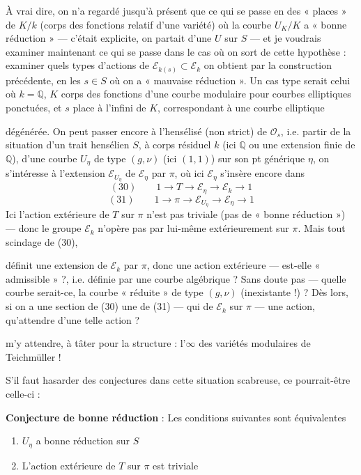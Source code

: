 \documentclass[11pt,a4paper]{article}
\begin{document}
À vrai dire, on n'a regardé jusqu'à présent que ce qui se passe en des
« places » de $K/k$ (corps des fonctions relatif d'une variété) où la
 courbe $U_K/K$ a « bonne réduction » — c'était explicite, on
partait d'une $U$ sur $S$ — et je voudrais examiner maintenant ce qui se passe
dans le cas où on sort de cette hypothèse : examiner quels types d'actions de
$\mathcal{E}_{k(s)} \subset \mathcal{E}_k$ on obtient par la construction
précédente, en les $s \in S$ où on a « mauvaise réduction ». Un cas type serait
celui où $k = \mathbb{Q}$, $K$ corps des fonctions d'une courbe modulaire pour
courbes elliptiques  ponctuées, et $s$ place
à l'infini de $K$, correspondant à une courbe elliptique

dégénérée. On peut passer encore à l'hensélisé (non strict) de
$\mathcal{O}_s$, i.e. partir de la situation d'un trait hensélien $S$, à corps
résiduel $k$ (ici $\mathbb{Q}$ ou une extension finie de $\mathbb{Q}$), d'une
courbe $U_\eta$ de type $(g, \nu)$ (ici $(1,1)$) sur son pt générique $\eta$, on
s'intéresse à l'extension $\mathcal{E}_{U_\eta}$ de $\mathcal{E}_\eta$ par
$\pi$, où ici $\mathcal{E}_\eta$ s'insère encore dans
\[
  (30)\qquad 1 \to T \to \mathcal{E}_\eta \to \mathcal{E}_k \to 1
\]
\[
  (31)\qquad 1 \to \pi \to \mathcal{E}_{U_\eta} \to \mathcal{E}_\eta \to 1
\]
Ici l'action extérieure de $T$ sur $\pi$ n'est  pas
triviale (pas de « bonne réduction ») — donc le groupe $\mathcal{E}_k$
n'opère pas par lui-même extérieurement sur $\pi$. Mais tout scindage de (30),


définit une extension de $\mathcal{E}_k$ par $\pi$, donc une action extérieure
— est-elle « admissible » ?, i.e. définie par une courbe algébrique ? Sans doute
pas — quelle courbe serait-ce,  la courbe « réduite »
de type $(g, \nu)$ (inexistante !) ?
Dès lors, si on a une section de (30) \ill{} une de (31) — qui 
  \ill{} de $\mathcal{E}_k$ sur $\pi$ —
 une action, qu'attendre d'une telle action ?

 \ill{} m'y attendre, \ill{} à tâter \ill{} pour la structure :
l'$\infty$ des variétés modulaires de Teichmüller !

S'il faut hasarder des conjectures dans cette situation scabreuse, ce
pourrait-être celle-ci :

\textbf{Conjecture de bonne réduction} : Les conditions suivantes sont
équivalentes
\begin{enumerate}
  \item[a)] $U_\eta$ a bonne réduction sur $S$
  \item[b)] L'action extérieure de $T$ sur $\pi$ est triviale
\end{enumerate}
\end{document}
